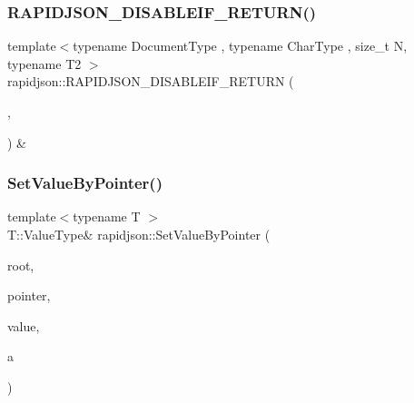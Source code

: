 \mbox{\label{namespacerapidjson_a00b64457f91e8bf7f82465d7b80613b0}} 
\subsubsection{\texorpdfstring{RAPIDJSON\_DISABLEIF\_RETURN()}{RAPIDJSON\_DISABLEIF\_RETURN()}\hspace{0.1cm}{\footnotesize\ttfamily [4/4]}}
{\footnotesize\ttfamily template$<$typename Document\+Type , typename Char\+Type , size\+\_\+t N, typename T2 $>$ \\
rapidjson\+::\+R\+A\+P\+I\+D\+J\+S\+O\+N\+\_\+\+D\+I\+S\+A\+B\+L\+E\+I\+F\+\_\+\+R\+E\+T\+U\+RN (\begin{DoxyParamCaption}\item[{(internal\+::\+Or\+Expr$<$ internal\+::\+Is\+Pointer$<$ T2 $>$, \mbox{\hyperlink{structrapidjson_1_1internal_1_1_is_generic_value}{internal\+::\+Is\+Generic\+Value}}$<$ T2 $>$ $>$)}]{,  }\item[{(typename Document\+Type\+::\+Value\+Type \&)}]{ }\end{DoxyParamCaption}) \&}

\mbox{\label{namespacerapidjson_af52a32038d7db6bd0916e79408bd5bbc}} 
\subsubsection{\texorpdfstring{SetValueByPointer()}{SetValueByPointer()}\hspace{0.1cm}{\footnotesize\ttfamily [1/12]}}
{\footnotesize\ttfamily template$<$typename T $>$ \\
T\+::\+Value\+Type\& rapidjson\+::\+Set\+Value\+By\+Pointer (\begin{DoxyParamCaption}\item[{T \&}]{root,  }\item[{const \mbox{\hyperlink{classrapidjson_1_1_generic_pointer}{Generic\+Pointer}}$<$ typename T\+::\+Value\+Type $>$ \&}]{pointer,  }\item[{typename T\+::\+Value\+Type \&}]{value,  }\item[{typename T\+::\+Allocator\+Type \&}]{a }\end{DoxyParamCaption})}



